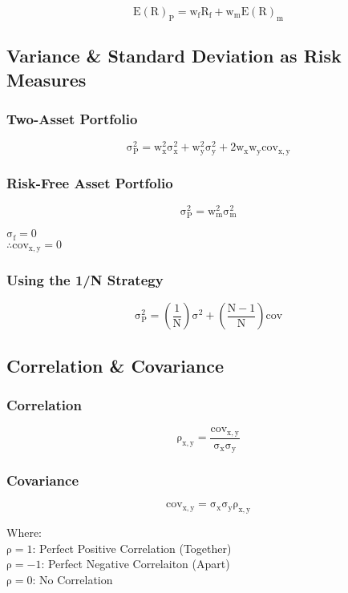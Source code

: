 \documentclass[11pt, english]{article}
\begin{document}
	$$\mathrm{E(R)_P=w_fR_f+w_mE(R)_m}$$

	\subsection{Variance \& Standard Deviation as Risk Measures}

		\subsubsection{Two-Asset Portfolio}

	$$\mathrm{\sigma_P^2=w_x^2\sigma_x^2+w_y^2\sigma_y^2+2w_xw_ycov_{x,y}}$$

		\subsubsection{Risk-Free Asset Portfolio}

	$$\mathrm{\sigma_P^2=w_m^2\sigma_m^2}$$

	$\mathrm{\sigma_f=0}$\\
	$\mathrm{\therefore cov_{x,y}=0}$

		\subsubsection{Using the 1/N Strategy}

	$$\mathrm{\sigma_P^2=\left(\frac{1}{N}\right)\sigma^2+\left(\frac{N-1}{N}\right)cov}$$

	\subsection{Correlation \& Covariance}

		\subsubsection{Correlation}

	$$\mathrm{\rho_{x,y}=\frac{cov_{x,y}}{\sigma_x\sigma_y}}$$

		\subsubsection{Covariance}

	$$\mathrm{cov_{x,y}=\sigma_x\sigma_y\rho_{x,y}}$$

	Where:\\
	$\mathrm{\rho=1}$: Perfect Positive Correlation (Together)\\
	$\mathrm{\rho=-1}$: Perfect Negative Correlaiton (Apart)\\
	$\mathrm{\rho=0}$: No Correlation
\end{document}

